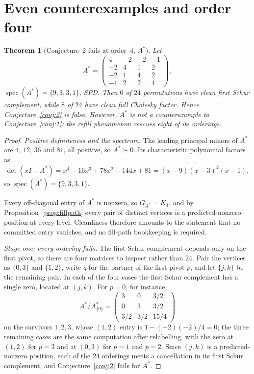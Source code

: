 \documentclass[11pt]{article}
\theoremstyle{plain}
\newtheorem{theorem}{Theorem}[section]
\theoremstyle{definition}
\theoremstyle{remark}
\begin{document}
\section{Even counterexamples and order four}\label{sec:even}
\begin{aiblock}
\begin{theorem}[Conjecture~2 fails at order~4, $A^*$]\label{thm:Astar}
Let
\[
A^*=\begin{pmatrix}4&-2&-2&-1\\-2&4&1&2\\-2&1&4&2\\-1&2&2&4\end{pmatrix},
\]
$\operatorname{spec}(A^*)=\{9,3,3,1\}$, SPD. Then $0$ of $24$ permutations have clean first Schur complement, while $8$ of $24$ have clean full Cholesky factor. Hence Conjecture~\ref{conj:2} is false. However, $A^*$ is not a counterexample to
Conjecture~\ref{conj:1}: the refill phenomenon rescues eight of its orderings.
\end{theorem}
\begin{proof}
\emph{Positive definiteness and the spectrum.} The leading principal minors of $A^*$ are $4$, $12$,
$36$ and $81$, all positive, so $A^*\succ0$. Its characteristic polynomial factors as
\[
  \det(xI-A^*)=x^4-16x^3+78x^2-144x+81=(x-9)(x-3)^2(x-1),
\]
so $\operatorname{spec}(A^*)=\{9,3,3,1\}$.

Every off-diagonal entry of $A^*$ is nonzero, so $G_{A^*}=K_4$, and by
Proposition~\ref{prop:fillpath} every pair of distinct vertices is a predicted-nonzero position at
every level. Cleanliness therefore amounts to the statement that no committed entry vanishes, and no
fill-path bookkeeping is required.

\emph{Stage one: every ordering fails.} The first Schur complement depends only on the first pivot, so
there are four matrices to inspect rather than $24$. Pair the vertices as $\{0,3\}$ and $\{1,2\}$,
write $q$ for the partner of the first pivot $p$, and let $\{j,k\}$ be the remaining pair. In each of
the four cases the first Schur complement has a single zero, located at $(j,k)$. For $p=0$, for
instance,
\[
  A^*/A^*_{\{0\}}=\begin{pmatrix}3&0&3/2\\0&3&3/2\\3/2&3/2&15/4\end{pmatrix}
\]
on the survivors $1,2,3$, whose $(1,2)$ entry is $1-(-2)(-2)/4=0$; the three remaining cases are the
same computation after relabelling, with the zero at $(1,2)$ for $p=3$ and at $(0,3)$ for $p=1$ and
$p=2$. Since $(j,k)$ is a predicted-nonzero position, each of the $24$ orderings meets a cancellation
in its first Schur complement, and Conjecture~\ref{conj:2} fails for $A^*$.


\end{proof}
\end{aiblock}
\end{document}
